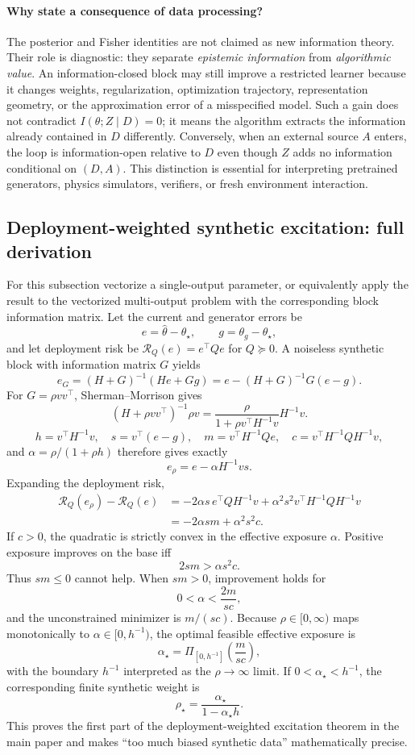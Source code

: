 \paragraph{Why state a consequence of data processing?}
The posterior and Fisher identities are not claimed as new information theory. Their role is diagnostic: they separate \emph{epistemic information} from \emph{algorithmic value}. An information-closed block may still improve a restricted learner because it changes weights, regularization, optimization trajectory, representation geometry, or the approximation error of a misspecified model. Such a gain does not contradict $I(\theta;Z\mid D)=0$; it means the algorithm extracts the information already contained in $D$ differently. Conversely, when an external source $A$ enters, the loop is information-open relative to $D$ even though $Z$ adds no information conditional on $(D,A)$. This distinction is essential for interpreting pretrained generators, physics simulators, verifiers, or fresh environment interaction.

\subsection{Deployment-weighted synthetic excitation: full derivation}\label{app:excitation-proof}
For this subsection vectorize a single-output parameter, or equivalently apply the result to the vectorized multi-output problem with the corresponding block information matrix. Let the current and generator errors be
\[
e=\widehat\theta-\theta_\star,\qquad g=\theta_g-\theta_\star,
\]
and let deployment risk be $\mathcal R_Q(e)=e^\top Qe$ for $Q\succeq0$. A noiseless synthetic block with information matrix $G$ yields
\[
e_G=(H+G)^{-1}(He+Gg)
=e-(H+G)^{-1}G(e-g).
\]
For $G=\rho vv^\top$, Sherman--Morrison gives
\[
(H+\rho vv^\top)^{-1}\rho v
=\frac{\rho}{1+\rho v^\top H^{-1}v}H^{-1}v.
\]
\[
h=v^\top H^{-1}v,\quad s=v^\top(e-g),\quad
m=v^\top H^{-1}Qe,\quad c=v^\top H^{-1}QH^{-1}v,
\]
and $\alpha=\rho/(1+\rho h)$ therefore gives exactly
\[
e_\rho=e-\alpha H^{-1}vs.
\]
Expanding the deployment risk,
\[
\begin{aligned}
\mathcal R_Q(e_\rho)-\mathcal R_Q(e)
&=-2\alpha s\,e^\top QH^{-1}v
+\alpha^2s^2v^\top H^{-1}QH^{-1}v\\
&=-2\alpha sm+\alpha^2s^2c.
\end{aligned}
\]
If $c>0$, the quadratic is strictly convex in the effective exposure $\alpha$. Positive exposure improves on the base iff
\[
2sm>\alpha s^2c.
\]
Thus $sm\le0$ cannot help. When $sm>0$, improvement holds for
\[
0<\alpha<\frac{2m}{sc},
\]
and the unconstrained minimizer is $m/(sc)$. Because $\rho\in[0,\infty)$ maps monotonically to $\alpha\in[0,h^{-1})$, the optimal feasible effective exposure is
\[
\alpha_\star=\Pi_{[0,h^{-1}]}
\left(\frac{m}{sc}\right),
\]
with the boundary $h^{-1}$ interpreted as the $\rho\to\infty$ limit. If $0<\alpha_\star<h^{-1}$, the corresponding finite synthetic weight is
\[
\rho_\star=\frac{\alpha_\star}{1-\alpha_\star h}.
\]
This proves the first part of the deployment-weighted excitation theorem in the main paper and makes ``too much biased synthetic data'' mathematically precise.

